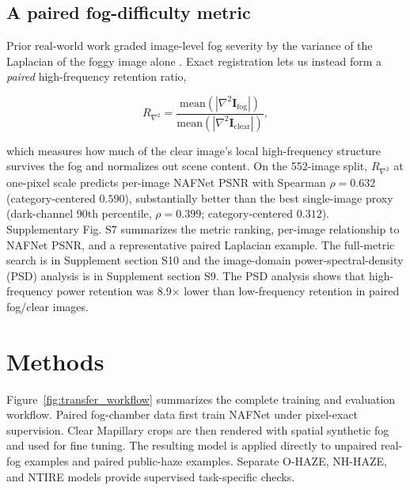 \documentclass{optica-article}
\begin{document}
\subsection{A paired fog-difficulty metric}
\label{subsec:fogdifficulty}
 
Prior real-world work graded image-level fog severity by the variance of the
Laplacian of the foggy image alone \cite{pollak2024stereofog}.
Exact registration lets us instead form a \emph{paired}
high-frequency retention ratio,
 
\begin{equation}
  R_{\nabla^2} =
    \frac{\mathrm{mean}\!\left(|\nabla^2 \mathbf{I}_{\mathrm{fog}}|\right)}
         {\mathrm{mean}\!\left(|\nabla^2 \mathbf{I}_{\mathrm{clear}}|\right)},
  \label{eq:laplacian_ratio}
\end{equation}
 
\noindent which measures how much of the clear image's local
high-frequency structure survives the fog and normalizes out scene
content. On the 552-image split, $R_{\nabla^2}$ at one-pixel scale
predicts per-image NAFNet PSNR with Spearman $\rho = 0.632$
(category-centered $0.590$), substantially better than the best
single-image proxy (dark-channel 90th percentile, $\rho = 0.399$;
category-centered $0.312$). Supplementary Fig. S7 summarizes the metric ranking, per-image relationship to NAFNet PSNR, and a representative paired Laplacian example. The full-metric search is in Supplement section S10 and the image-domain power-spectral-density (PSD) analysis is in Supplement section S9. The PSD analysis shows that high-frequency power retention was 8.9$\times$ lower than low-frequency retention in paired fog/clear images. 
 
\section{Methods}
\label{sec:methods}

Figure~\ref{fig:transfer_workflow} summarizes the complete training and
evaluation workflow. Paired fog-chamber data first train NAFNet under
pixel-exact supervision. Clear Mapillary crops are then rendered with
spatial synthetic fog and used for fine tuning. The resulting model is
applied directly to unpaired real-fog examples and paired public-haze
examples. Separate O-HAZE, NH-HAZE, and NTIRE models provide supervised
task-specific checks.
\end{document}
